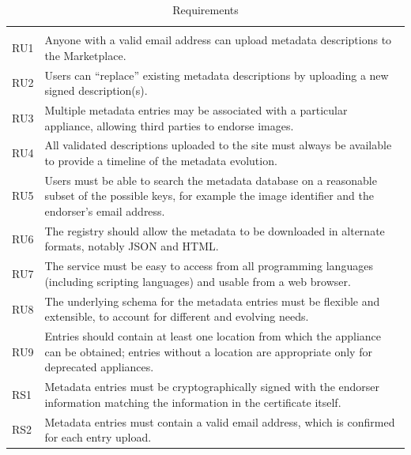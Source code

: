 \begin{table}
\caption{Requirements}
\label{tab:requirements}
\begin{center}
\begin{tabular}{lp{}}
\hline\hline

\\ RU1 & Anyone with a valid email address can upload metadata
descriptions to the Marketplace\@.

\\ RU2 & Users can ``replace'' existing metadata descriptions by
uploading a new signed description(s).

\\ RU3 & Multiple metadata entries may be associated with a particular
appliance, allowing third parties to endorse images.

\\ RU4 & All validated descriptions uploaded to the site must always
be available to provide a timeline of the metadata evolution.

\\ RU5 & Users must be able to search the metadata database on a
reasonable subset of the possible keys, for example the image
identifier and the endorser's email address.

\\ RU6 & The registry should allow the metadata to be downloaded in
alternate formats, notably JSON and HTML.

\\ RU7 & The service must be easy to access from all programming
languages (including scripting languages) and usable from a web
browser.

\\ RU8 & The underlying schema for the metadata entries must be
flexible and extensible, to account for different and evolving needs.

\\ RU9 & Entries should contain at least one location from which the
appliance can be obtained; entries without a location are
appropriate only for deprecated appliances.

\\

\hline

\rule{0pt}{15pt}RS1 & Metadata entries must be cryptographically
signed with the endorser information matching the information in the
certificate itself.

\\ RS2 & Metadata entries must contain a valid email address, which is
confirmed for each entry upload.


\end{tabular}
\end{center}
\end{table}
